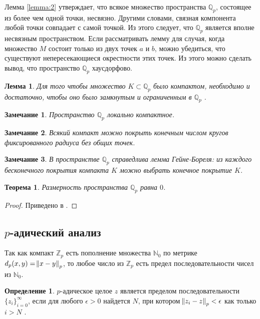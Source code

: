 \documentclass[master, och, diploma, times]{sty/SCWorks}
\theoremstyle{plain}
\newtheorem{thethm}{Теорема}[section]
\newtheorem{lemma}{Лемма}[section]
\newtheorem{note}{Замечание}[section]
\theoremstyle{definition}
\newtheorem{defn}{Определение}[section]
\numberwithin{equation}{section}
\begin{document}
Лемма \eqref{lemma:2} утверждает, что всякое множество пространства $\mathbb {Q}_p$, состоящее из более чем одной точки, несвязно. Другими словами, связная компонента любой точки совпадает с самой точкой. Из этого следует, что $\mathbb {Q}_p$ является вполне несвязным пространством. Если рассматривать лемму для случая, когда множество $M$ состоит только из двух точек $a$ и $b$, можно убедиться, что существуют непересекающиеся окрестности этих точек. Из этого можно сделать вывод, что пространство $\mathbb {Q}_p$ хаусдорфово.

\begin{lemma}
Для того чтобы множество $K \subset \mathbb {Q}_p$ было компактом, необходимо и достаточно, чтобы оно было замкнутым и ограниченным в $\mathbb {Q}_p$ \cite{bib:analysis:anashin:3}.
\end{lemma}

\begin{note}
Пространство $\mathbb {Q}_p$ локально компактное.
\end{note}

\begin{note}
Всякий компакт можно покрыть конечным числом кругов фиксированного радиуса без общих точек.
\end{note}

\begin{note}
В пространстве $\mathbb {Q}_p$ справедлива лемма Гейне-Бореля: из каждого бесконечного покрытия компакта $K$ можно выбрать конечное покрытие $K$.
\end{note}

\begin{thethm}
Размерность пространства $\mathbb {Q}_p$ равна $0$.
\end{thethm}
\begin{proof}
Приведено в \cite{bib:analysis:kobliz}.
\end{proof}

\subsection{$p$-адический анализ}

Так как компакт $\mathbb {Z}_p$ есть пополнение множества $\mathbb {N}_0$ по метрике \linebreak ${d_p(x,y)=\norm{x-y}_p}$, то любое число из $\mathbb {Z}_p$ есть предел последовательности чисел из $\mathbb {N}_0$.

\begin{defn}
$p$-адическое целое $z$ является пределом последовательности $\{z_i\}^{\infty}_{i=0}$, если для любого $\epsilon > 0$ найдется $N$, при котором $\norm{z_i-z}_p < \epsilon$ как только $i>N$ \cite{bib:dynamic:anashin}.
\end{defn}
\end{document}
